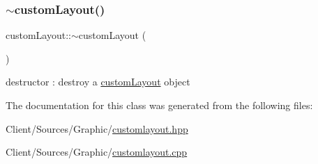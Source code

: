 \subsubsection{\texorpdfstring{$\sim$custom\+Layout()}{~customLayout()}}
{\footnotesize\ttfamily custom\+Layout\+::$\sim$custom\+Layout (\begin{DoxyParamCaption}{ }\end{DoxyParamCaption})}

destructor \+: destroy a \hyperlink{classcustomLayout}{custom\+Layout} object 

The documentation for this class was generated from the following files\+:\begin{DoxyCompactItemize}
\item 
Client/\+Sources/\+Graphic/\hyperlink{customlayout_8hpp}{customlayout.\+hpp}\item 
Client/\+Sources/\+Graphic/\hyperlink{customlayout_8cpp}{customlayout.\+cpp}\end{DoxyCompactItemize}
